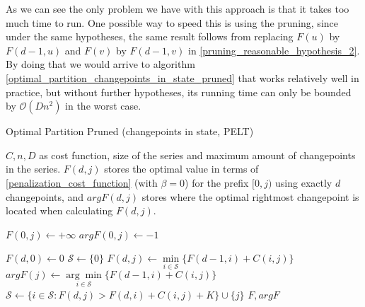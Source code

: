 \documentclass[pdflatex,sn-mathphys]{sn-jnl}%
\theoremstyle{thmstyleone}%
\theoremstyle{thmstyletwo}%
\theoremstyle{thmstylethree}%
\begin{document}
As we can see the only problem we have with this approach is that it takes too much time to run. One possible way to speed this is using the pruning, since under the same hypotheses, the same result follows from replacing $F(u)$ by $F(d-1,u)$ and $F(v)$ by $F(d-1, v)$ in \ref{pruning_reasonable_hypothesis_2}. By doing that we would arrive to algorithm \ref{optimal_partition_changepoints_in_state_pruned} that works relatively well in practice, but without further hypotheses, its running time can only be bounded by $\mathcal{O}(Dn^2)$ in the worst case.

\begin{algorithm}[H]
\caption{Optimal Partition Pruned (changepoints in state, PELT) }\label{optimal_partition_changepoints_in_state_pruned}
\begin{algorithmic}[1]
\Require $C, n, D$ as cost function, size of the series and maximum amount of changepoints in the series. 
\Ensure $F(d,j)$ stores the optimal value in terms of \ref{penalization_cost_function} (with $\beta = 0$) for the prefix $[0,j)$ using exactly $d$ changepoints, and $argF(d,j)$ stores where the optimal rightmost changepoint is located when calculating $F(d,j)$. 

    \State $F(0,j) \leftarrow +\infty$
    \State $argF(0,j) \leftarrow -1$
    
\EndFor 


 
    \State $F(d,0) \leftarrow 0$ 
    \State 
    \State $\mathcal{S} \leftarrow \{ 0\}$
     
  \State $F(d,j) \leftarrow \underset{i \in \mathcal{S}}{\min} \{ F(d-1,i) + C(i,j) \}$ 
  \State $argF(j)\leftarrow \underset{i \in \mathcal{S}}{\arg \min} \{ F(d-1,i) + C(i,j) \}$ 
  \State $\mathcal{S} \leftarrow \{i \in \mathcal{S} : F(d,j) > F(d,i) + C(i,j) + K \} \cup \{j\}$ 
\EndFor
\EndFor
\State \Return $F, argF$
\end{algorithmic}
\end{algorithm}
\end{document}
